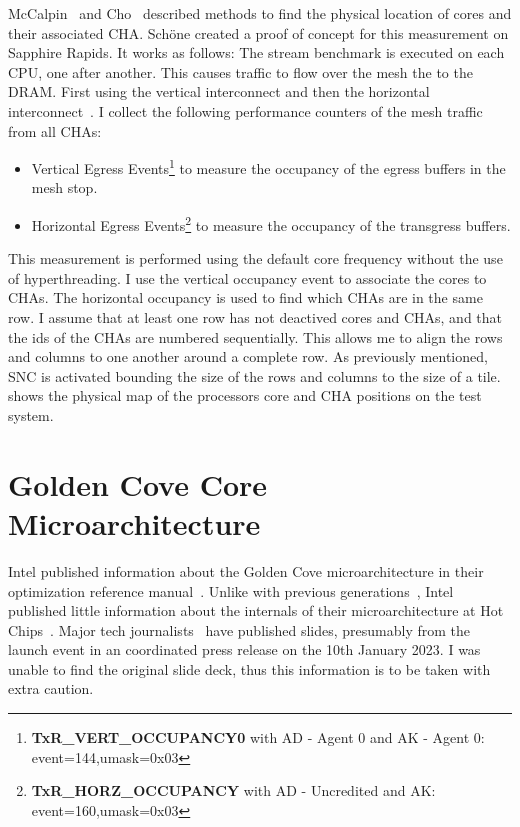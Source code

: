 McCalpin~\cite{McCalpin_2021_CoreMapping} and Cho~\cite{Cho_2022_KnowYourNeighbor} described methods to find the physical location of cores and their associated \ac{CHA}.
Schöne created a proof of concept for this measurement on Sapphire Rapids.
It works as follows:
The stream benchmark is executed on each \ac{CPU}, one after another.
This causes traffic to flow over the mesh the to the \ac{DRAM}.
First using the vertical interconnect and then the horizontal interconnect~\cite{Intel_2018_SkylakeSP}.
I collect the following performance counters of the mesh traffic from all \ac{CHA}s:
\begin{itemize}
	\item Vertical Egress Events\footnote{\textbf{TxR\_VERT\_OCCUPANCY0} with AD - Agent 0 and AK - Agent 0: event=144,umask=0x03} to measure the occupancy of the egress buffers in the mesh stop.
	\item Horizontal Egress Events\footnote{\textbf{TxR\_HORZ\_OCCUPANCY} with AD - Uncredited and AK: event=160,umask=0x03} to measure the occupancy of the transgress buffers.
\end{itemize}
This measurement is performed using the default core frequency without the use of hyperthreading.
I use the vertical occupancy event to associate the cores to \ac{CHA}s.
The horizontal occupancy is used to find which \ac{CHA}s are in the same row.
I assume that at least one row has not deactived cores and \ac{CHA}s, and that the ids of the \ac{CHA}s are numbered sequentially.
This allows me to align the rows and columns to one another around a complete row.
As previously mentioned, \ac{SNC} is activated bounding the size of the rows and columns to the size of a tile.
 shows the physical map of the processors core and \ac{CHA} positions on the test system.

\section{Golden Cove Core Microarchitecture}

Intel published information about the Golden Cove microarchitecture in their optimization reference manual~\cite[Sec. 2.4]{Intel_Optimization_Reference_Manual_050}.
Unlike with previous generations~\cite{Intel_2017_Skylake_SP,Intel_2020_IceLake_SP}, Intel published little information about the internals of their microarchitecture at Hot Chips~\cite{Intel_2021_Hotchips}.
Major tech journalists~\cite{ServerTheHome_2023_SPR_Press,TechGage_2023_SPR_Press,HotHardware_2023_SPR_Press,Wccftech_2023_SPR_Press} have published slides, presumably from the launch event in an coordinated press release on the 10th January 2023.
I was unable to find the original slide deck, thus this information is to be taken with extra caution.

